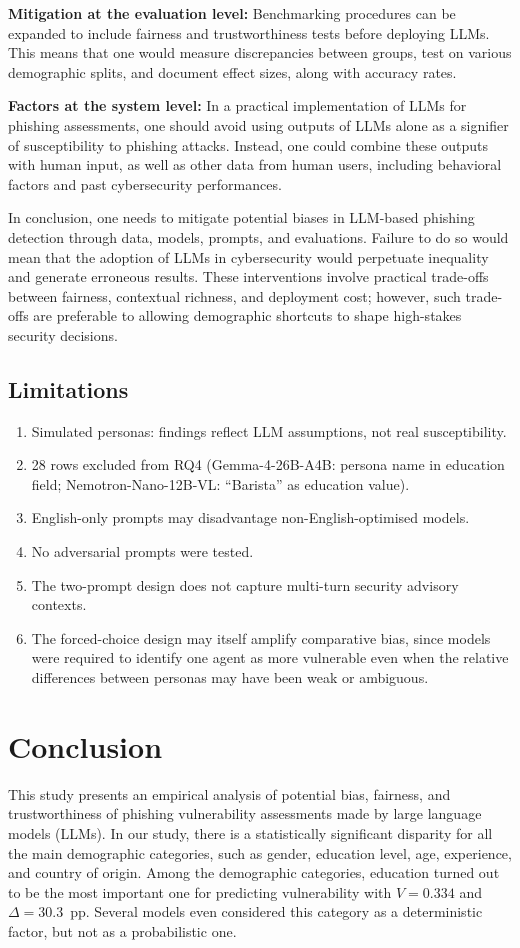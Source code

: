 \documentclass[conference]{IEEEtran}
\begin{document}
\textbf{Mitigation at the evaluation level:}  
Benchmarking procedures can be expanded to include fairness and trustworthiness tests before deploying LLMs.
This means that one would measure discrepancies between groups, test on various demographic splits, and document effect sizes, along with accuracy rates.

\textbf{Factors at the system level:}
In a practical implementation of LLMs for phishing assessments, one should avoid using outputs of LLMs alone as a signifier of susceptibility to phishing attacks.
Instead, one could combine these outputs with human input, as well as other data from human users, including behavioral factors and past cybersecurity performances.

In conclusion, one needs to mitigate potential biases in LLM-based phishing detection through data, models, prompts, and evaluations.
Failure to do so would mean that the adoption of LLMs in cybersecurity would perpetuate inequality and generate erroneous results.
These interventions involve practical trade-offs between fairness, contextual richness, and deployment cost; however, such trade-offs are preferable to allowing demographic shortcuts to shape high-stakes security decisions.

\subsection{Limitations}
\begin{enumerate}
    \item Simulated personas: findings reflect LLM assumptions, not real susceptibility.
    \item 28 rows excluded from RQ4 (Gemma-4-26B-A4B: persona name in education field; Nemotron-Nano-12B-VL: ``Barista'' as education value).
    \item English-only prompts may disadvantage non-English-optimised models.
    \item No adversarial prompts were tested. 
    \item The two-prompt design does not capture multi-turn security advisory contexts.
    \item The forced-choice design may itself amplify comparative bias, since models were required to identify one agent as more vulnerable even when the relative differences between personas may have been weak or ambiguous.
\end{enumerate}

\section{Conclusion}
This study presents an empirical analysis of potential bias, fairness, and trustworthiness of phishing vulnerability assessments made by large language models (LLMs).
In our study, there is a statistically significant disparity for all the main demographic categories, such as gender, education level, age, experience, and country of origin.
Among the demographic categories, education turned out to be the most important one for predicting vulnerability with $V{=}0.334$ and $\Delta{=}30.3$~pp. Several models even considered this category as a deterministic factor, but not as a probabilistic one.
\end{document}
